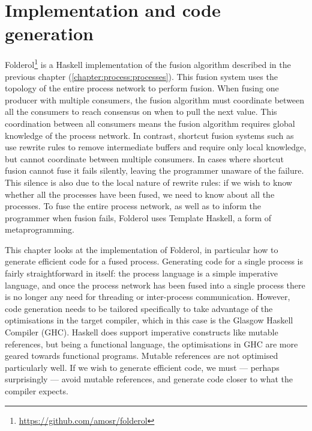 \chapter{Implementation and code generation}
\label{chapter:process:implementation}

Folderol\footnote{\url{https://github.com/amosr/folderol}} is a Haskell implementation of the fusion algorithm described in the previous chapter (\cref{chapter:process:processes}).
This fusion system uses the topology of the entire process network to perform fusion.
When fusing one producer with multiple consumers, the fusion algorithm must coordinate between all the consumers to reach consensus on when to pull the next value.
This coordination between all consumers means the fusion algorithm requires global knowledge of the process network.
In contrast, shortcut fusion systems such as \cite{gill1993short} use rewrite rules to remove intermediate buffers and require only local knowledge, but cannot coordinate between multiple consumers.
In cases where shortcut fusion cannot fuse it fails silently, leaving the programmer unaware of the failure.
This silence is also due to the local nature of rewrite rules: if we wish to know whether all the processes have been fused, we need to know about all the processes.
To fuse the entire process network, as well as to inform the programmer when fusion fails, Folderol uses Template Haskell, a form of metaprogramming.

This chapter looks at the implementation of Folderol, in particular how to generate efficient code for a fused process.
Generating code for a single process is fairly straightforward in itself: the process language is a simple imperative language, and once the process network has been fused into a single process there is no longer any need for threading or inter-process communication.
However, code generation needs to be tailored specifically to take advantage of the optimisations in the target compiler, which in this case is the Glasgow Haskell Compiler (GHC).
Haskell does support imperative constructs like mutable references, but being a functional language, the optimisations in GHC are more geared towards functional programs.
Mutable references are not optimised particularly well.
If we wish to generate efficient code, we must --- perhaps surprisingly --- avoid mutable references, and generate code closer to what the compiler expects.










